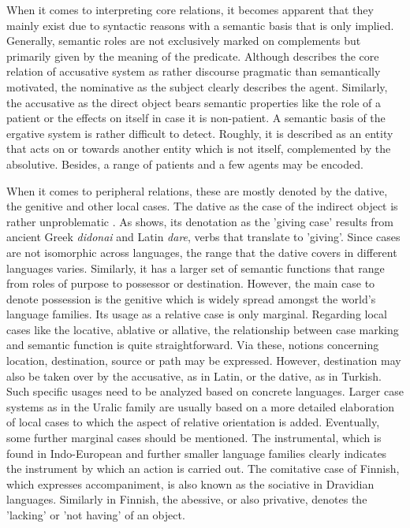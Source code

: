 \documentclass[11pt,a4paper,twoside,openright]{scrbook}
\begin{document}
When it comes to interpreting  core relations, it becomes apparent that they mainly exist due to syntactic reasons with a semantic basis that is only implied. Generally, semantic roles are not exclusively marked on complements but primarily given by the meaning of the predicate. Although \citet{blake1994case} describes the core relation of accusative system as rather discourse pragmatic than semantically motivated, the nominative as the subject clearly describes the agent. Similarly, the accusative as the direct object bears semantic properties like the role of a patient or the effects on itself in case it is non-patient. A semantic basis of the ergative system is rather difficult to detect. Roughly, it is described as an entity that acts on or towards another entity which is not itself, complemented by the absolutive. Besides, a range of patients and a few agents may be encoded.

When it comes to peripheral relations, these are mostly denoted by the dative, the genitive and other local cases. The dative as the case of the indirect object is rather unproblematic \citep{haspelmath2012hbocas}. As \citet{blake1994case} shows, its denotation as the 'giving case' results from ancient Greek \textit{didonai} and Latin \textit{dare}, verbs that translate to 'giving'. Since cases are not isomorphic across languages, the range that the dative covers in different languages varies. Similarly, it has a larger set of semantic functions that range from roles of purpose to possessor or destination. However, the main case to denote possession is the genitive which is widely spread amongst the world's language families. Its usage as a relative case is only marginal. Regarding local cases like the locative, ablative or allative, the relationship between case marking and semantic function is quite straightforward. Via these, notions concerning location, destination, source or path may be expressed. However, destination may also be taken over by the accusative, as in Latin, or the dative, as in Turkish. Such specific usages need to be analyzed based on concrete languages.  Larger case systems as in the Uralic family are usually based on a more detailed elaboration of local cases to which the aspect of relative orientation is added. Eventually, some further marginal cases should be mentioned. The instrumental, which is found in Indo-European and further smaller language families clearly indicates the instrument by which an action is carried out. The comitative case of Finnish, which expresses accompaniment, is also known as the sociative in Dravidian languages. Similarly in Finnish, the abessive, or also privative, denotes the 'lacking' or 'not having' of an object.
\end{document}
